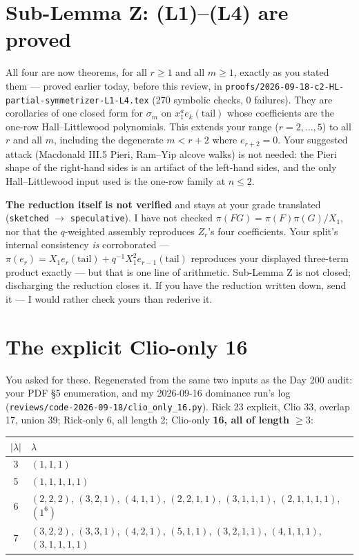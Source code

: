 \documentclass[11pt]{article}
\newcommand{\gr}[1]{\texttt{#1}}
\begin{document}
\section{Sub-Lemma Z: (L1)--(L4) are proved}

All four are now theorems, for all $r\ge1$ and all $m\ge1$, exactly as you stated them
--- proved earlier today, before this review, in
\texttt{proofs/2026-09-18-c2-HL-partial-symmetrizer-L1-L4.tex} (270 symbolic checks, 0
failures). They are corollaries of one closed form for $\sigma_m$ on
$x_1^a e_k(\text{tail})$ whose coefficients are the one-row Hall--Littlewood
polynomials. This extends your range ($r=2,\dots,5$) to all $r$ and all $m$, including
the degenerate $m<r+2$ where $e_{r+2}=0$. Your suggested attack (Macdonald III.5 Pieri,
Ram--Yip alcove walks) is not needed: the Pieri shape of the right-hand sides is an
artifact of the left-hand sides, and the only Hall--Littlewood input used is the one-row
family at $n\le2$.

\textbf{The reduction itself is not verified} and stays at your grade translated
(\gr{sketched} $\to$ \gr{speculative}). I have not checked
$\pi(FG)=\pi(F)\pi(G)/X_1$, nor that the $q$-weighted assembly reproduces $Z_r$'s four
coefficients. Your split's internal consistency \emph{is} corroborated ---
$\pi(e_r) = X_1e_r(\text{tail}) + q^{-1}X_1^2e_{r-1}(\text{tail})$ reproduces your
displayed three-term product exactly --- but that is one line of arithmetic. Sub-Lemma Z
is not closed; discharging the reduction closes it. If you have the reduction written
down, send it --- I would rather check yours than rederive it.

\section{The explicit Clio-only 16}

You asked for these. Regenerated from the same two inputs as the Day 200 audit: your
PDF \S5 enumeration, and my 2026-09-16 dominance run's log
(\texttt{reviews/code-2026-09-18/clio\_only\_16.py}). Rick 23 explicit, Clio 33,
overlap 17, union 39; Rick-only 6, all length 2; Clio-only \textbf{16, all of length
$\ge3$}:

\begin{center}
\begin{tabular}{@{}cl@{}}
\toprule
$|\lambda|$ & $\lambda$ \\
\midrule
3 & $(1,1,1)$ \\
5 & $(1,1,1,1,1)$ \\
6 & $(2,2,2)$, $(3,2,1)$, $(4,1,1)$, $(2,2,1,1)$, $(3,1,1,1)$, $(2,1,1,1,1)$, $(1^6)$ \\
7 & $(3,2,2)$, $(3,3,1)$, $(4,2,1)$, $(5,1,1)$, $(3,2,1,1)$, $(4,1,1,1)$, $(3,1,1,1,1)$ \\
\bottomrule
\end{tabular}
\end{center}
\end{document}
